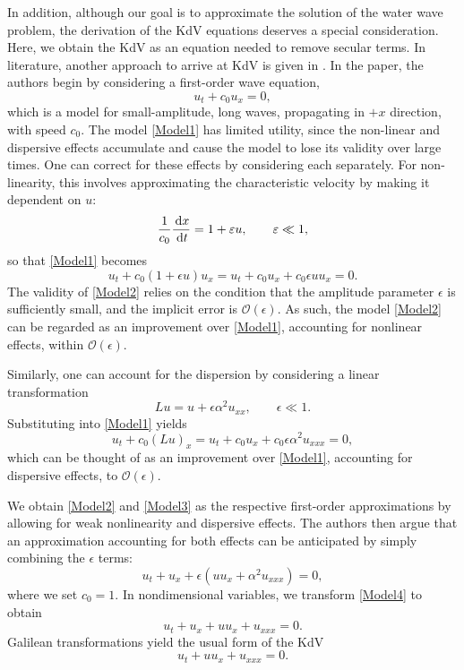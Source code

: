 \documentclass[11pt,reqno,oneside,a4paper]{article}
\begin{document}
In addition, although our goal is to approximate the solution of the water wave problem, the derivation of the KdV equations deserves a special consideration. Here, we obtain the KdV as an equation needed to remove secular terms. In literature, another approach to arrive at KdV is given in \cite{BBM1972}. In the paper, the authors begin by considering a first-order wave equation,
\begin{equation}\label{Model1}
u_t + c_0 u_x = 0,
\end{equation} 
which is a model for small-amplitude, long waves, propagating in $+x$ direction, with speed $c_0.$ The model \eqref{Model1} has limited utility, since the non-linear and dispersive effects accumulate and cause the model to lose its validity over large times.  One can correct for these effects by considering each separately. For non-linearity, this involves approximating the characteristic velocity by making it dependent on $u:$
\[ \frac{1}{c_0} \frac{\,\mathrm{d} x}{\,\mathrm{d} t} = 1 +  \varepsilon u, \qquad \varepsilon \ll 1,\]
so that \eqref{Model1} becomes
\begin{equation}\label{Model2}
u_t + c_0 (1+ \epsilon u)u_x = u_t + c_0 u_x + c_0 \epsilon u u_x  = 0.
\end{equation}
The validity of \eqref{Model2} relies on the condition that the amplitude parameter $\epsilon$ is sufficiently small, and the implicit error is $\mathcal{O}(\epsilon).$ As such, the model \eqref{Model2} can be regarded as an improvement over \eqref{Model1}, accounting for nonlinear effects, within $\mathcal{O}(\epsilon).$ 

Similarly, one can account for the dispersion by considering a linear transformation
\[ Lu = u + \epsilon \alpha^2 u_{xx}, \qquad \epsilon \ll 1.\]
Substituting into \eqref{Model1} yields
\begin{equation}\label{Model3}
u_t + c_0 (Lu)_x= u_t + c_0 u_x + c_0 \epsilon \alpha^2 u_{xxx}  = 0, 
\end{equation}
which can be thought of as an improvement over \eqref{Model1}, accounting for dispersive effects, to $\mathcal{O}(\epsilon).$ 

We obtain \eqref{Model2} and \eqref{Model3} as the respective first-order approximations by allowing for weak nonlinearity and dispersive effects. The authors then argue that an approximation accounting for both effects can be anticipated by simply combining the $\epsilon$ terms:
\begin{equation}\label{Model4}
u_t + u_x + \epsilon(u u_x + \alpha^2 u_{xxx}) = 0,
\end{equation} 
where we set $c_0 =1.$ In nondimensional variables, we transform \eqref{Model4} to obtain 
\[ u_t + u_x + uu_x + u_{xxx} = 0.\] 
Galilean transformations yield the usual form of the KdV 
\[ u_t +uu_x + u_{xxx} = 0. \]
\end{document}
